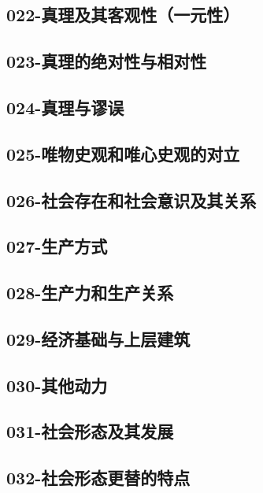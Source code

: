 \subsection{022-真理及其客观性（一元性）}

\subsection{023-真理的绝对性与相对性}

\subsection{024-真理与谬误}

\subsection{025-唯物史观和唯心史观的对立}

\subsection{026-社会存在和社会意识及其关系}

\subsection{027-生产方式}

\subsection{028-生产力和生产关系}

\subsection{029-经济基础与上层建筑}

\subsection{030-其他动力}

\subsection{031-社会形态及其发展}

\subsection{032-社会形态更替的特点}

